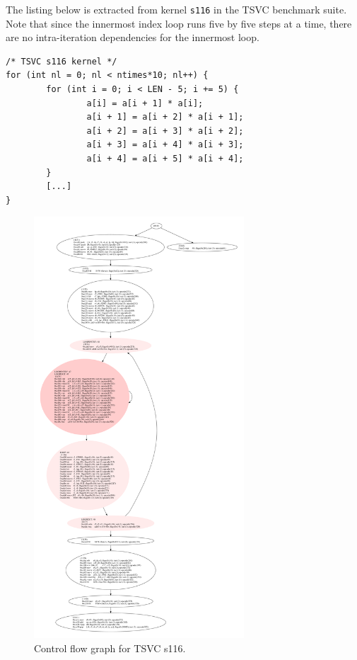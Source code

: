 \documentclass[11pt, a4paper, twoside]{montblanc2}
\begin{document}
The listing below is extracted from kernel \texttt{s116} in the TSVC benchmark
suite. Note that since the innermost index loop runs five by five steps at a time, there are no
intra-iteration dependencies for the innermost loop.
\lstset{style=C}
\begin{lstlisting}
/* TSVC s116 kernel */
for (int nl = 0; nl < ntimes*10; nl++) {
        for (int i = 0; i < LEN - 5; i += 5) {
                a[i] = a[i + 1] * a[i];
                a[i + 1] = a[i + 2] * a[i + 1];
                a[i + 2] = a[i + 3] * a[i + 2];
                a[i + 3] = a[i + 4] * a[i + 3];
                a[i + 4] = a[i + 5] * a[i + 4];
        }
        [...]
}
\end{lstlisting}
\begin{figure}[p]
  \centering
\includegraphics[width=0.70\textwidth]{cfg_s116}
\caption{Control flow graph for TSVC s116.}\label{fig:cfgs116}
\end{figure}
\end{document}
